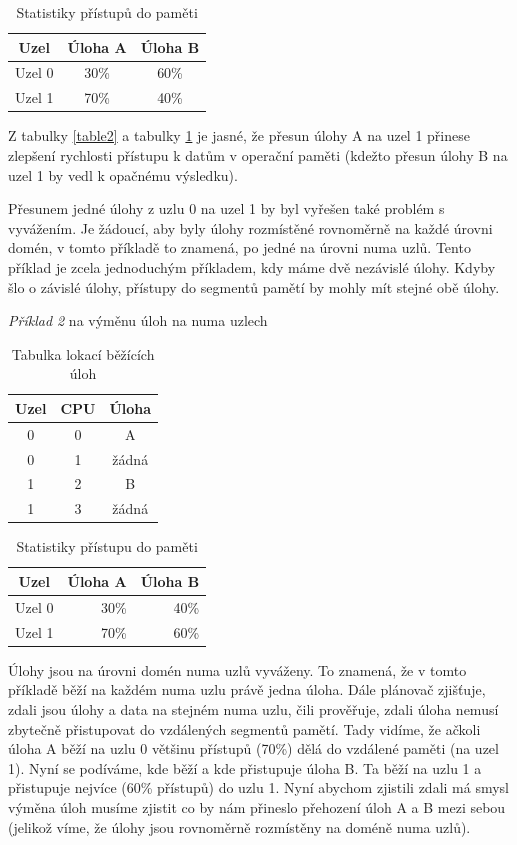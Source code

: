 \documentclass[
  field=ainfk,
  biblatex,
  glossaries,
  index
]{kidiplom}
\begin{document}
\begin{table}[h]
\centering
\begin{tabular}{|c|c|c|}
\hline
Uzel & Úloha A & Úloha B \\
\hline
Uzel 0 & 30\% & 60\% \\
\hline
Uzel 1 & 70\% & 40\% \\
\hline
\end{tabular}
\caption{Statistiky přístupů do paměti}
\label{table3}
\end{table}

Z tabulky \ref{table2} a tabulky \ref{table3} je jasné, že přesun úlohy A na uzel 1 přinese zlepšení rychlosti přístupu k datům v operační paměti (kdežto přesun úlohy B na uzel 1 by vedl k opačnému výsledku).

Přesunem jedné úlohy z uzlu 0 na uzel 1 by byl vyřešen také problém s vyvážením. Je žádoucí, aby byly úlohy rozmístěné rovnoměrně na každé úrovni domén, v tomto příkladě to znamená, po jedné na úrovni numa uzlů. Tento příklad je zcela jednoduchým příkladem, kdy máme dvě nezávislé úlohy. Kdyby šlo o závislé úlohy, přístupy do segmentů pamětí by mohly mít stejné obě úlohy.

\newpage
\noindent
\textit{Příklad 2} na výměnu úloh na numa uzlech

\begin{table}[h]
\centering
\begin{tabular}{|c|c|c|}
\hline
Uzel & CPU & Úloha \\
\hline
0 & 0 & A \\
\hline
0 & 1 & žádná  \\
\hline
1 & 2 & B \\
\hline
1 & 3 & žádná \\
\hline
\end{tabular}
\caption{Tabulka lokací běžících úloh}
\label{table4}
\end{table}

\begin{table}[h]
\centering
\begin{tabular}{|c|r|r|}
\hline
Uzel & Úloha A & Úloha B \\
\hline
Uzel 0 & 30\% & 40\% \\
\hline
Uzel 1 & 70\% & 60\% \\
\hline
\end{tabular}
\caption{Statistiky přístupu do paměti}
\label{table5}
\end{table}

Úlohy jsou na úrovni domén numa uzlů vyváženy. To znamená, že v tomto příkladě běží na každém numa uzlu právě jedna úloha. Dále plánovač zjišťuje, zdali jsou úlohy a data na stejném numa uzlu, čili prověřuje, zdali úloha nemusí zbytečně přistupovat do vzdálených segmentů pamětí.  Tady vidíme, že ačkoli úloha A běží na uzlu 0 většinu přístupů (70\%) dělá do vzdálené paměti (na uzel 1). Nyní se podíváme, kde běží a kde přistupuje úloha B. Ta běží na uzlu 1 a přistupuje nejvíce (60\% přístupů) do uzlu 1. Nyní abychom zjistili zdali má smysl výměna úloh musíme zjistit co by nám přineslo přehození úloh A a B mezi sebou (jelikož víme, že úlohy jsou rovnoměrně rozmístěny na doméně numa uzlů).
\end{document}
